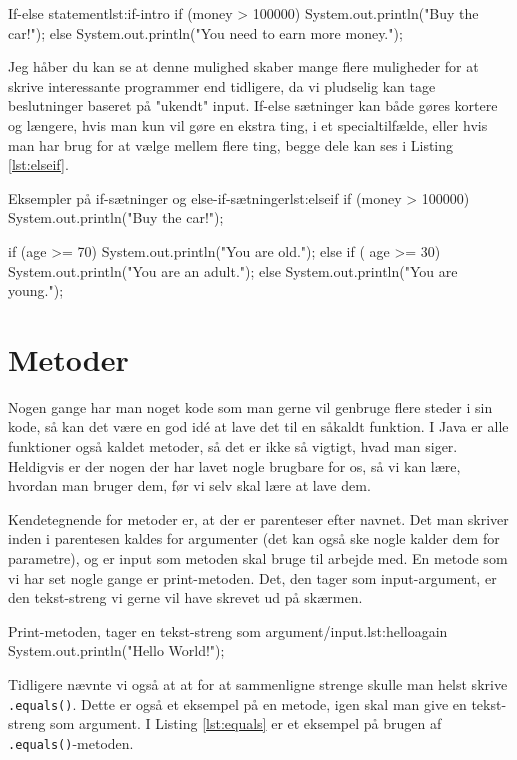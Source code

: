 \begin{JavaCode}{If-else statement}{lst:if-intro}
	if (money > 100000) {
		System.out.println("Buy the car!");
	} else {
		System.out.println("You need to earn more money.");
	}
\end{JavaCode}

Jeg håber du kan se at denne mulighed skaber mange flere muligheder for at skrive interessante programmer end tidligere, da vi pludselig kan tage beslutninger baseret på "ukendt" input. If-else sætninger kan både gøres kortere og længere, hvis man kun vil gøre en ekstra ting, i et specialtilfælde, eller hvis man har brug for at vælge mellem flere ting, begge dele kan ses i Listing \ref{lst:elseif}.

\begin{JavaCode}{Eksempler på if-sætninger og else-if-sætninger}{lst:elseif}
	if (money > 100000) {
		System.out.println("Buy the car!");
	}
	
	if (age >= 70) {
		System.out.println("You are old.");
	} else if ( age >= 30) {
		System.out.println("You are an adult.");
	} else {
		System.out.println("You are young.");
	}
\end{JavaCode}

\section{Metoder}
Nogen gange har man noget kode som man gerne vil genbruge flere steder i sin kode, så kan det være en god idé at lave det til en såkaldt funktion. I Java er alle funktioner også kaldet metoder, så det er ikke så vigtigt, hvad man siger. Heldigvis er der nogen der har lavet nogle brugbare for os, så vi kan lære, hvordan man bruger dem, før vi selv skal lære at lave dem. 

Kendetegnende for metoder er, at der er parenteser efter navnet. Det man skriver inden i parentesen kaldes for argumenter (det kan også ske nogle kalder dem for parametre), og er input som metoden skal bruge til arbejde med. En metode som vi har set nogle gange er print-metoden. Det, den tager som input-argument, er den tekst-streng vi gerne vil have skrevet ud på skærmen.

\begin{JavaCode}{Print-metoden, tager en tekst-streng som argument/input.}{lst:helloagain}
	System.out.println("Hello World!");
\end{JavaCode}

Tidligere nævnte vi også at at for at sammenligne strenge skulle man helst skrive \texttt{.equals()}. Dette er også et eksempel på en metode, igen skal man give en tekst-streng som argument. I Listing \ref{lst:equals} er et eksempel på brugen af \texttt{.equals()}-metoden.

